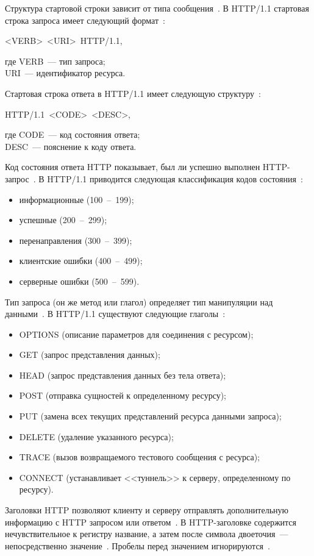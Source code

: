 Структура стартовой строки зависит от типа сообщения~\cite{http}.
В HTTP/1.1 стартовая строка запроса имеет следующий формат~\cite{http}:
\begin{center}
	<VERB>~<URI>~HTTP/1.1,
\end{center}
где VERB~--- тип запроса;\\
\text{~~~~~~}URI~--- идентификатор ресурса.

Стартовая строка ответа в HTTP/1.1 имеет следующую структуру~\cite{http}:
\begin{center}
	HTTP/1.1~<CODE>~<DESC>,
\end{center}
где CODE~--- код состояния ответа;\\
\text{~~~~~~}DESC~--- пояснение к коду ответа.

Код состояния ответа HTTP показывает, был ли успешно выполнен HTTP-запрос~\cite{http}.
В HTTP/1.1 приводится следующая классификация кодов состояния~\cite{http}:
\begin{itemize}
	\item информационные (100~--~199);
	\item успешные (200~--~299);
	\item перенаправления (300~--~399);
	\item клиентские ошибки (400~--~499);
	\item серверные ошибки (500~--~599).
\end{itemize}

Тип запроса (он же метод или глагол) определяет тип манипуляции над данными~\cite{http}.
В HTTP/1.1 существуют следующие глаголы~\cite{http}:
\begin{itemize}
	\item OPTIONS (описание параметров для соединения с ресурсом);
	\item GET (запрос представления данных);
	\item HEAD (запрос представления данных без тела ответа);
	\item POST (отправка сущностей к определенному ресурсу);
	\item PUT (замена всех текущих представлений ресурса данными запроса);
	\item DELETE (удаление указанного ресурса);
	\item TRACE (вызов возвращаемого тестового сообщения с ресурса);
	\item CONNECT (устанавливает <<туннель>> к серверу, определенному по ресурсу).
\end{itemize}

Заголовки HTTP позволяют клиенту и серверу отправлять дополнительную информацию с HTTP запросом или ответом~\cite{http}.
В HTTP-заголовке содержится нечувствительное к регистру название, а затем после символа двоеточия~--- непосредственно значение~\cite{http}.
Пробелы перед значением игнорируются~\cite{http}.

